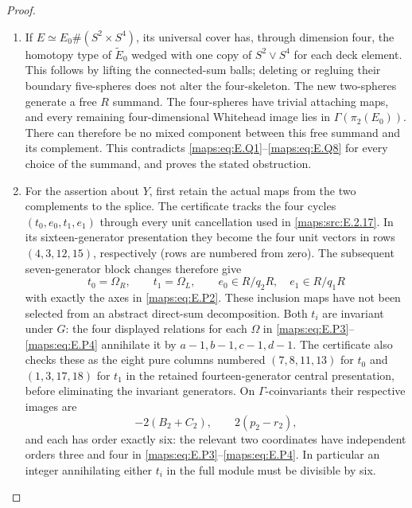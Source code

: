 \begin{proof}
\begin{enumerate}[label=\arabic*.,leftmargin=*]
\item If $E\simeq E_0\#(S^2\times S^4)$, its universal cover
has, through dimension four, the homotopy type of
$\widetilde E_0$ wedged with one copy of $S^2\vee S^4$
for each deck element.  This follows by lifting the
connected-sum balls; deleting or regluing their boundary
five-spheres does not alter the four-skeleton.  The new
two-spheres generate a free $R$ summand.  The four-spheres
have trivial attaching maps, and every remaining
four-dimensional Whitehead image lies in
$\Gamma(\pi_2(E_0))$.  There can therefore be no mixed
component between this free summand and its complement.
This contradicts \eqref{maps:eq:E.Q1}--\eqref{maps:eq:E.Q8} for every choice of the
summand, and proves the stated obstruction.

\item For the assertion about $Y$, first retain the actual maps
from the two complements to the splice.  The certificate
 tracks the four cycles
$(t_0,e_0,t_1,e_1)$ through every unit cancellation used in
\ref{maps:src:E.2.17}.  In its sixteen-generator presentation they become
the four unit vectors in rows $(4,3,12,15)$, respectively
(rows are numbered from zero).  The subsequent seven-generator
block changes therefore give
\[
 t_0=\Omega_R,\qquad t_1=\Omega_L,
 \qquad e_0\in R/q_2R,\quad e_1\in R/q_1R
 \tag{E.Q9}\label{maps:eq:E.Q9}
\]
with exactly the axes in \eqref{maps:eq:E.P2}.  These inclusion maps have
not been selected from an abstract direct-sum decomposition.
Both $t_i$ are invariant under $G$: the four displayed
relations for each $\Omega$ in \eqref{maps:eq:E.P3}--\eqref{maps:eq:E.P4} annihilate
it by $a-1,b-1,c-1,d-1$.  The certificate also checks these
as the eight pure columns numbered
$(7,8,11,13)$ for $t_0$ and $(1,3,17,18)$ for $t_1$
in the retained fourteen-generator central presentation,
before eliminating the invariant generators.
On $\Gamma$-coinvariants
their respective images are
\[
 -2(B_2+C_2),\qquad 2(p_2-r_2),
 \tag{E.Q10}\label{maps:eq:E.Q10}
\]
and each has order exactly six: the relevant two coordinates
have independent orders three and four in \eqref{maps:eq:E.P3}--\eqref{maps:eq:E.P4}.
In particular an integer annihilating either $t_i$ in the
full module must be divisible by six.


\end{enumerate}
\end{proof}

